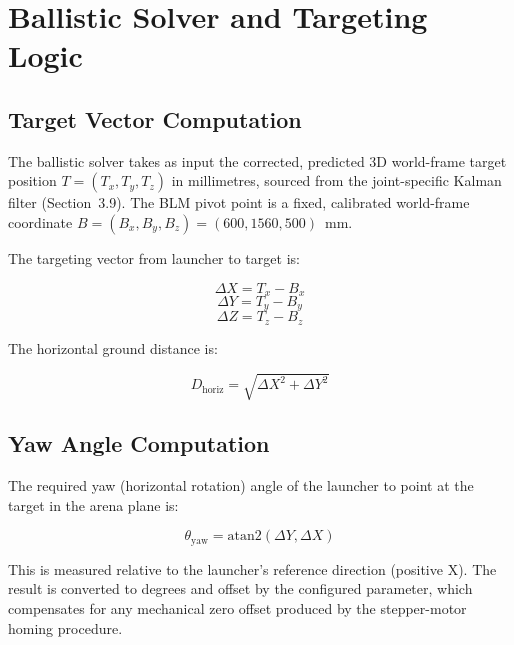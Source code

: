 \section{Ballistic Solver and Targeting Logic}

\subsection{Target Vector Computation}

The ballistic solver takes as input the corrected, predicted 3D world-frame target position $T = (T_x, T_y, T_z)$ in millimetres, sourced from the joint-specific Kalman filter (Section~3.9). The BLM pivot point is a fixed, calibrated world-frame coordinate $B = (B_x, B_y, B_z) = (600, 1560, 500)$~mm.

The targeting vector from launcher to target is:

\begin{equation}
\Delta X = T_x - B_x \label{eq:3_1}
\end{equation}
\begin{equation}
\Delta Y = T_y - B_y \label{eq:3_2}
\end{equation}
\begin{equation}
\Delta Z = T_z - B_z \label{eq:3_3}
\end{equation}

The horizontal ground distance is:

\begin{equation}
D_{\text{horiz}} = \sqrt{\Delta X^2 + \Delta Y^2} \label{eq:3_4}
\end{equation}

\subsection{Yaw Angle Computation}

The required yaw (horizontal rotation) angle of the launcher to point at the target in the arena plane is:

\begin{equation}
\theta_{\text{yaw}} = \mathrm{atan2}(\Delta Y, \Delta X) \label{eq:3_5}
\end{equation}

This is measured relative to the launcher's reference direction (positive X). The result is converted to degrees and offset by the configured \texttt{} parameter, which compensates for any mechanical zero offset produced by the stepper-motor homing procedure.

